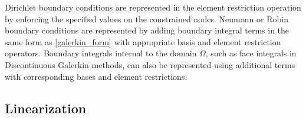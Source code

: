 Dirichlet boundary conditions are represented in the element restriction operation by enforcing the specified values on the constrained nodes.
Neumann or Robin boundary conditions are represented by adding boundary integral terms in the same form as \ref{galerkin_form} with appropriate basis and element restriction operators.
Boundary integrals internal to the domain $\Omega$, such as face integrals in Discontinuous Galerkin methods, can also be represented using additional terms with corresponding bases and element restrictions.

\subsection{Linearization}

